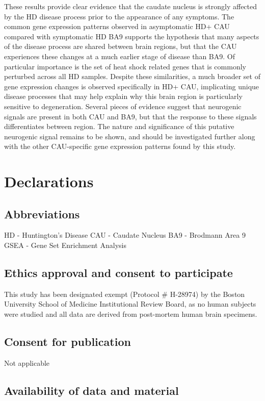 \documentclass[fleqn,10pt,table]{wlscirep}
\begin{document}
These results provide clear evidence that the caudate nucleus is strongly affected by the HD disease process prior to the appearance of any symptoms.
The common gene expression patterns observed in asymptomatic HD+ CAU compared with symptomatic HD BA9 supports the hypothesis that many aspects of the disease process are shared between brain regions, but that the CAU experiences these changes at a much earlier stage of disease than BA9.
Of particular importance is the set of heat shock related genes that is commonly perturbed across all HD samples.
Despite these similarities, a much broader set of gene expression changes is observed specifically in HD+ CAU, implicating unique disease processes that may help explain why this brain region is particularly sensitive to degeneration.
Several pieces of evidence suggest that neurogenic signals are present in both CAU and BA9, but that the response to these signals differentiates between region.
The nature and significance of this putative neurogenic signal remains to be shown, and should be investigated further along with the other CAU-specific gene expression patterns found by this study.

\section{Declarations}

\subsection{Abbreviations}
HD - Huntington's Disease
CAU - Caudate Nucleus
BA9 - Brodmann Area 9
GSEA - Gene Set Enrichment Analysis

\subsection{Ethics approval and consent to participate}

This study has been designated exempt (Protocol # H-28974) by the Boston University School of Medicine Institutional Review Board, as no human subjects were studied and all data are derived from post-mortem human brain specimens.

\subsection{Consent for publication}

Not applicable

\subsection{Availability of data and material}
\end{document}
